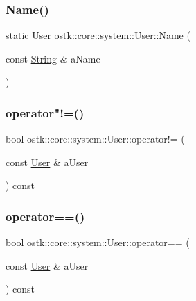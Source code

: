 \subsubsection{\texorpdfstring{Name()}{Name()}}
{\footnotesize\ttfamily static \hyperlink{classostk_1_1core_1_1system_1_1_user}{User} ostk\+::core\+::system\+::\+User\+::\+Name (\begin{DoxyParamCaption}\item[{const \hyperlink{classostk_1_1core_1_1types_1_1_string}{String} \&}]{a\+Name }\end{DoxyParamCaption})\hspace{0.3cm}{\ttfamily [static]}}

\mbox{\label{classostk_1_1core_1_1system_1_1_user_ac11fea5211b9e8faa2ae07c1ba5fa154}} 
\subsubsection{\texorpdfstring{operator"!=()}{operator!=()}}
{\footnotesize\ttfamily bool ostk\+::core\+::system\+::\+User\+::operator!= (\begin{DoxyParamCaption}\item[{const \hyperlink{classostk_1_1core_1_1system_1_1_user}{User} \&}]{a\+User }\end{DoxyParamCaption}) const}

\mbox{\label{classostk_1_1core_1_1system_1_1_user_a58e11432b4f5e0c37edf841d3360f58b}} 
\subsubsection{\texorpdfstring{operator==()}{operator==()}}
{\footnotesize\ttfamily bool ostk\+::core\+::system\+::\+User\+::operator== (\begin{DoxyParamCaption}\item[{const \hyperlink{classostk_1_1core_1_1system_1_1_user}{User} \&}]{a\+User }\end{DoxyParamCaption}) const}

